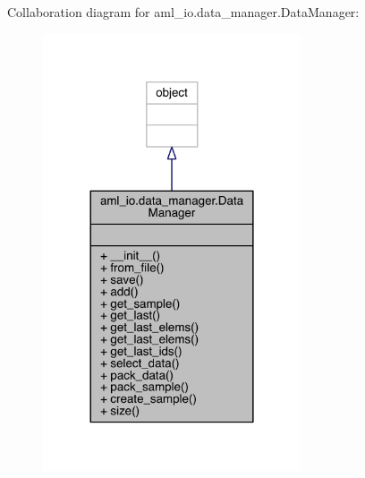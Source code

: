 Collaboration diagram for aml\+\_\+io.\+data\+\_\+manager.\+Data\+Manager\+:
\nopagebreak
\begin{figure}[H]
\begin{center}
\leavevmode
\includegraphics[width=216pt]{classaml__io_1_1data__manager_1_1_data_manager__coll__graph}
\end{center}
\end{figure}
